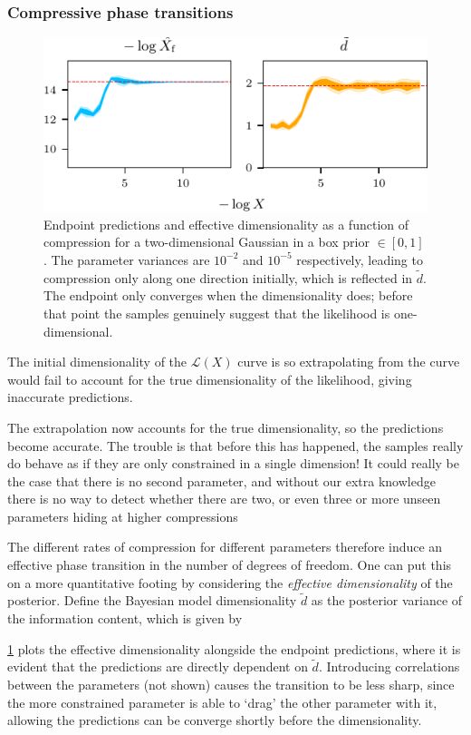 \documentclass[usenatbib]{mnras}
\begin{document}
\subsubsection*{Compressive phase transitions}
\begin{figure}
\begin{center}
\includegraphics{figures/phase_transition.pdf}
\end{center}
\caption{Endpoint predictions and effective dimensionality as a function of compression for a two-dimensional Gaussian in a box prior $\in [0, 1]$. The parameter variances are $10^{-2}$ and $10^{-5}$ respectively, leading to compression only along one direction initially, which is reflected in $\tilde{d}$. The endpoint only converges when the dimensionality does; before that point the samples genuinely suggest that the likelihood is one-dimensional.}
\label{fig:phase_transition}
\end{figure}
The initial dimensionality of the $\mathcal{L}(X)$ curve is so extrapolating from the curve would fail to account for the true dimensionality of the likelihood, giving inaccurate predictions.
\par
The extrapolation now accounts for the true dimensionality, so the predictions become accurate. The trouble is that before this has happened, the samples really do behave as if they are only constrained in a single dimension! It could really be the case that there is no second parameter, and without our extra knowledge there is no way to detect whether there are two, or even three or more unseen parameters hiding at higher compressions
\par
The different rates of compression for different parameters therefore induce an effective phase transition in the number of degrees of freedom. One can put this on a more quantitative footing by considering the \textit{effective dimensionality} of the posterior. Define the Bayesian model dimensionality $\tilde{d}$ as the posterior variance of the information content, which is given by
\par
\cref{fig:phase_transition} plots the effective dimensionality alongside the endpoint predictions, where it is evident that the predictions are directly dependent on $\tilde{d}$. Introducing correlations between the parameters (not shown) causes the transition to be less sharp, since the more constrained parameter is able to `drag' the other parameter with it, allowing the predictions can be converge shortly before the dimensionality.
\end{document}
